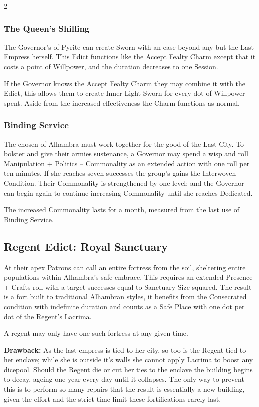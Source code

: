 \begin{multicols}{2}
\subsubsection*{The Queen's Shilling}

The Governor's of Pyrite can create Sworn with an ease beyond any but the Last Empress herself. This Edict functions like the Accept Fealty Charm except that it costs a point of Willpower, and the duration decreases to one Session.

If the Governor knows the Accept Fealty Charm they may combine it with the Edict, this allows them to create Inner Light Sworn for every dot of Willpower spent. Aside from the increased effectiveness the Charm functions as normal. 

\subsubsection*{Binding Service}

The chosen of Alhambra must work together for the good of the Last City. To bolster and give their armies sustenance, a Governor may spend a wisp and roll Manipulation + Politics – Commonality as an extended action with one roll per ten minutes. If she reaches seven successes the group's gains the Interwoven Condition. Their Commonality is strengthened by one level; and the Governor can begin again to continue increasing Commonality until she reaches Dedicated. 

The increased Commonality lasts for a month, measured from the last use of Binding Service. 

\subsection*{Regent Edict: Royal Sanctuary}

At their apex Patrons can call an entire fortress from the soil, sheltering entire populations within Alhambra's safe embrace. This requires an extended Presence + Crafts roll with a target successes equal to Sanctuary Size squared. The result is a fort built to traditional Alhambran styles, it benefits from the Consecrated condition with indefinite duration and counts as a Safe Place with one dot per dot of the Regent's Lacrima. 

A regent may only have one such fortress at any given time. 

\textbf{Drawback:} As the last empress is tied to her city, so too is the Regent tied to her enclave; while she is outside it's walls she cannot apply Lacrima to boost any dicepool. Should the Regent die or cut her ties to the enclave the building begins to decay, ageing one year every day until it collapses. The only way to prevent this is to perform so many repairs that the result is essentially a new building, given the effort and the strict time limit these fortifications rarely last. 

\end{multicols}